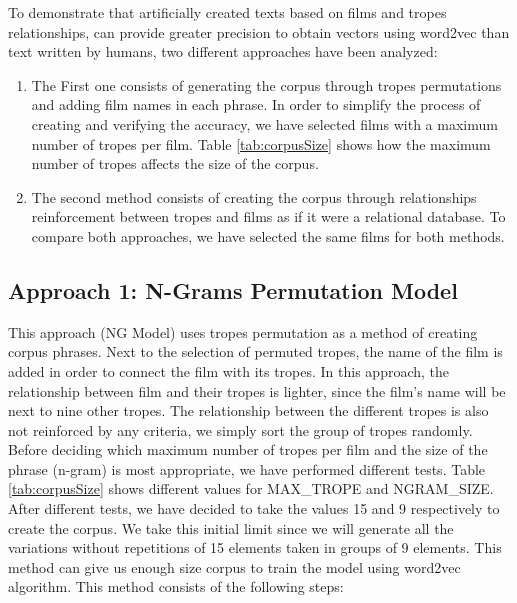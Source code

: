 \documentclass[letterpaper]{article}
\begin{document}
	
	To demonstrate that artificially created texts based on films and tropes relationships, can provide greater precision to obtain vectors using word2vec than text written by humans, two different approaches have been analyzed:
	\begin{enumerate}
	\item The First one consists of generating the corpus through tropes permutations and adding film names in each phrase. In order to simplify the process of creating and verifying the accuracy, we have selected films with a maximum number of tropes per film. Table \ref{tab:corpusSize} shows how the maximum number of tropes affects the size of the corpus.
	
	\item The second method consists of creating the corpus through relationships reinforcement between tropes and films as if it were a relational database. To compare both approaches, we have selected the same films for both methods.
	\end{enumerate}
	
	\subsection{Approach 1: N-Grams Permutation Model}

	This approach (NG Model) uses tropes permutation as a method of creating corpus phrases. Next to the selection of permuted tropes, the name of the film is added in order to connect the film with its tropes. In this approach, the relationship between film and their tropes is lighter, since the film's name will be next to nine other tropes. The relationship between the different tropes is also not reinforced by any criteria, we simply sort the group of tropes randomly. Before deciding which maximum number of tropes per film and the size of the phrase (n-gram) is most appropriate, we have performed different tests. Table \ref{tab:corpusSize} shows different values for MAX\_TROPE and NGRAM\_SIZE. After different tests, we have decided to take the values 15 and 9 respectively to create the corpus. We take this
	initial limit since we will generate all the variations
	without repetitions of 15 elements taken in groups of 9
	elements. This method can give us enough size corpus to train the model using word2vec algorithm. This method consists of the following steps:
	
\end{document}
